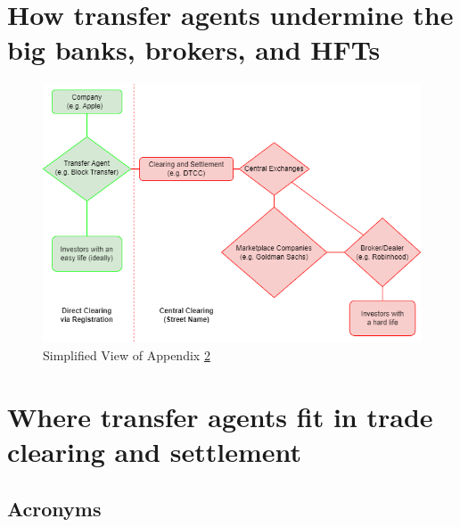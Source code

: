 \documentclass[11pt, english]{article}
\begin{document}
\appendix

\section{How transfer agents undermine the big banks, brokers, and HFTs}

\begin{figure}[H]
    \centering
    \includegraphics[width=420pt]{imgs/ownership-simplified.png}
    \caption{Simplified View of Appendix \ref{appendix-b}}
\end{figure}
\pagebreak

\section{Where transfer agents fit in trade clearing and settlement}\label{appendix-b}

\subsection*{Acronyms}
\end{document}
